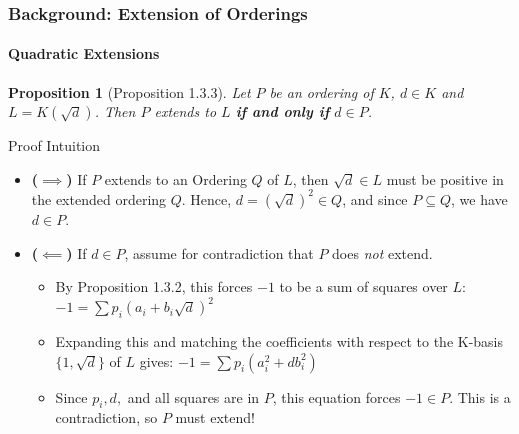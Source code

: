 \documentclass[11pt]{beamer}
\newtheorem{proposition}{Proposition}
\begin{document}
\begin{frame}
    \frametitle{Background: Extension of Orderings}
    \framesubtitle{Quadratic Extensions}
    \vspace{-0.4em}
    \begin{proposition}[Proposition 1.3.3]
        Let $P$ be an ordering of $K$, $d \in K$ and $L = K(\sqrt{d})$. Then $P$ extends to $L$ \textbf{if and only if} $d \in P$.
    \end{proposition}
    \vspace{-0.4em}

    \begin{block}{Proof Intuition}
        \begin{itemize}
            \item \textbf{($\implies$)} If $P$ extends to an Ordering $Q$ of $L$, then $\sqrt{d} \in L$ must be positive in the extended ordering $Q$. Hence, $d = (\sqrt{d})^2 \in Q$, and since $P \subseteq Q$, we have $d \in P$.
            \vspace{0.4em}
            \item \textbf{($\impliedby$)} If $d \in P$, assume for contradiction that $P$ does \emph{not} extend.
            \begin{itemize}
                \item By Proposition 1.3.2, this forces $-1$ to be a sum of squares over $L$: \\
                      $-1 = \sum p_i(a_i + b_i\sqrt{d})^2$
                \item Expanding this and matching the coefficients with respect to the K-basis $\{1, \sqrt{d}\}$ of $L$ gives: 
                      $-1 = \sum p_i(a_i^2 + d b_i^2)$
                \item Since $p_i, d,$ and all squares are in $P$, this equation forces $-1 \in P$. This is a contradiction, so $P$ must extend!
            \end{itemize}
        \end{itemize}
    \end{block}
\end{frame}
\end{document}
